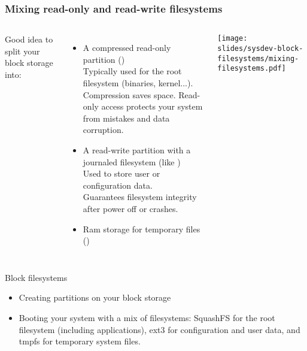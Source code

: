 \begin{frame}
  \frametitle{Mixing read-only and read-write filesystems}
  \begin{columns}
    Good idea to split your block storage into:
    \begin{itemize}
    \item A compressed read-only partition ()\\
      Typically used for the root filesystem (binaries, kernel...).\\
      Compression saves space. Read-only access protects your system
      from mistakes and data corruption.
    \item A read-write partition with a journaled filesystem (like )\\
      Used to store user or configuration data.\\
      Guarantees filesystem integrity after power off or crashes.
    \item Ram storage for temporary files ()
    \end{itemize}
    \texttt{[image: slides/sysdev-block-filesystems/mixing-filesystems.pdf]}
  \end{columns}
\end{frame}

\setuplabframe
{Block filesystems}
{
  \begin{itemize}
  \item Creating partitions on your block storage
  \item Booting your system with a mix of filesystems: SquashFS for
    the root filesystem (including applications), ext3 for
    configuration and user data, and tmpfs for
    temporary system files.
  \end{itemize}
}
